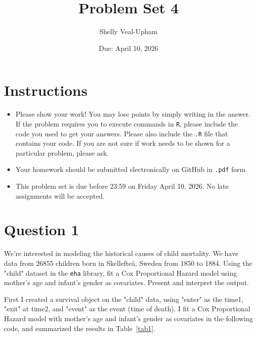 \documentclass[12pt,letterpaper]{article}
\title{Problem Set 4}
\date{Due: April 10, 2026}
\author{Shelly Veal-Upham}
\begin{document}
	\maketitle
	\section*{Instructions}
	\begin{itemize}
	\item Please show your work! You may lose points by simply writing in the answer. If the problem requires you to execute commands in \texttt{R}, please include the code you used to get your answers. Please also include the \texttt{.R} file that contains your code. If you are not sure if work needs to be shown for a particular problem, please ask.
	\item Your homework should be submitted electronically on GitHub in \texttt{.pdf} form.
	\item This problem set is due before 23:59 on Friday April 10, 2026. No late assignments will be accepted.

	\end{itemize}

	\vspace{.25cm}
\section*{Question 1}
\vspace{.25cm}
\noindent We're interested in modeling the historical causes of child mortality. We have data from 26855 children born in Skellefteå, Sweden from 1850 to 1884. Using the "child" dataset in the \texttt{eha} library, fit a Cox Proportional Hazard model using mother's age and infant's gender as covariates. Present and interpret the output.\\
\vspace{0.2cm}

First I created a survival object on the "child" data, using "enter" as the time1, "exit" at time2, and "event" as the event (time of death). I fit a Cox Proportional Hazard model with mother's age and infant's gender as covariates in the following code, and summarized the results in Table~\ref{tab1}. 

	
\newpage
\end{document}
